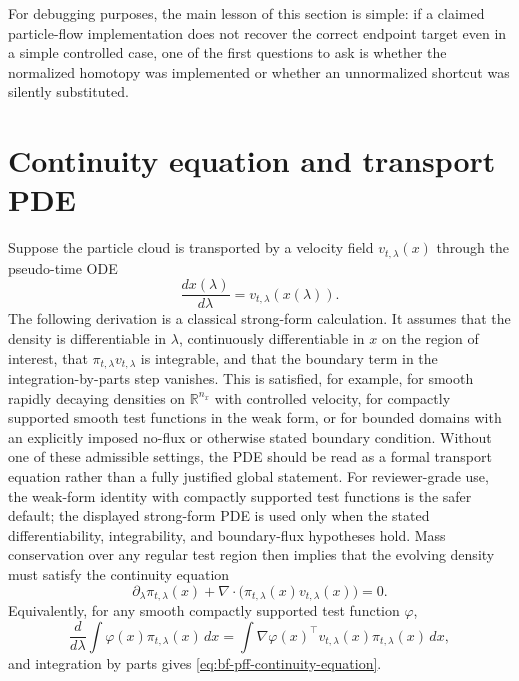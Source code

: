 For debugging purposes, the main lesson of this section is simple: if a claimed
particle-flow implementation does not recover the correct endpoint target even in
a simple controlled case, one of the first questions to ask is whether the
normalized homotopy was implemented or whether an unnormalized shortcut was
silently substituted.

\section{Continuity equation and transport PDE}
\label{sec:bf-pff-continuity}

Suppose the particle cloud is transported by a velocity field
$v_{t,\lambda}(x)$ through the pseudo-time ODE
\begin{equation}
\label{eq:bf-pff-particle-ode}
  \frac{d x(\lambda)}{d\lambda} = v_{t,\lambda}(x(\lambda)).
\end{equation}
The following derivation is a classical strong-form calculation.  It assumes
that the density is differentiable in $\lambda$, continuously differentiable in
$x$ on the region of interest, that
$\pi_{t,\lambda}v_{t,\lambda}$ is integrable, and that the boundary term in the
integration-by-parts step vanishes.  This is satisfied, for example, for smooth
rapidly decaying densities on $\mathbb R^{n_x}$ with controlled velocity, for
compactly supported smooth test functions in the weak form, or for bounded
domains with an explicitly imposed no-flux or otherwise stated boundary
condition.  Without one of these admissible settings, the PDE should be read as
a formal transport equation rather than a fully justified global statement.
For reviewer-grade use, the weak-form identity with compactly supported test
functions is the safer default; the displayed strong-form PDE is used only when
the stated differentiability, integrability, and boundary-flux hypotheses hold.
Mass conservation over any regular test region then implies that the evolving
density must satisfy the continuity equation
\begin{equation}
\label{eq:bf-pff-continuity-equation}
  \partial_\lambda \pi_{t,\lambda}(x)
  + \nabla \cdot \bigl(\pi_{t,\lambda}(x)
  v_{t,\lambda}(x)\bigr) = 0.
\end{equation}
Equivalently, for any smooth compactly supported test function $\varphi$,
\[
  \frac{d}{d\lambda}
  \int \varphi(x)\pi_{t,\lambda}(x)\,dx
  =
  \int \nabla\varphi(x)^\top
  v_{t,\lambda}(x)\pi_{t,\lambda}(x)\,dx,
\]
and integration by parts gives \eqref{eq:bf-pff-continuity-equation}.
